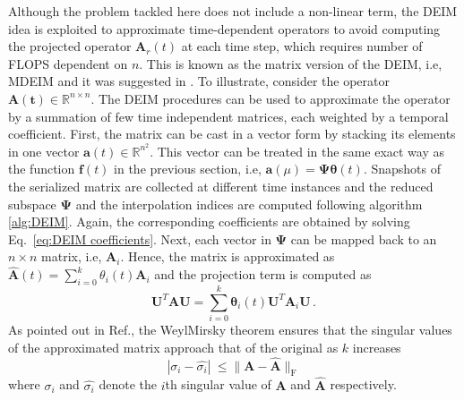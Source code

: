 \documentclass[]{interact}
\theoremstyle{plain}%
\theoremstyle{definition}
\theoremstyle{remark}
\begin{document}
Although the problem tackled here does not include a non-linear term, the DEIM idea is exploited to approximate time-dependent operators to avoid computing the projected operator $\mathbf{A}_r(t)$ at each time step, which requires number of FLOPS dependent on $n$.
This is known as the matrix version of the DEIM, i.e, MDEIM and it was suggested in \cite{carlberg2012efficient, benner2015survey}.
To illustrate, consider the operator $\mathbf{A}(\boldsymbol{t}) \in \mathbb{R}^{n\times n}$.
The DEIM procedures can be used to approximate the operator by a summation of few time independent matrices, each weighted by a temporal coefficient.
First, the matrix can be cast in a vector form by stacking its elements in one vector $\mathbf{a}(t) \in \mathbb{R}^{n^2}$.
This vector can be treated in the same exact way as the function $\mathbf{f}(t)$ in the previous section, i.e, $\mathbf{a}(\mu) = \mathbf{\Psi}\boldsymbol{\theta}(t)$.
Snapshots of the serialized matrix are collected at different time instances and the reduced subspace $\mathbf{\Psi}$ and the interpolation indices are computed following algorithm \ref{alg:DEIM}.
Again, the corresponding coefficients are obtained by solving Eq.~\ref{eq:DEIM coefficients}. 
Next, each vector in $\mathbf{\Psi}$ can be mapped back to an $n \times n$ matrix, i.e, $\textbf{A}_i$.
Hence, the matrix is approximated as $\mathbf{\hat{A}}(t)=\sum_{i=0}^k \theta_i(t) \mathbf{A}_i$ and the projection term is computed as
\begin{equation}
	\mathbf{U}^T\mathbf{A}\mathbf{U} = \sum_{i=0}^k \mathbf{\theta}_i(t)\mathbf{U}^T\mathbf{A}_i\mathbf{U} \, .
	\label{Eq:deim matrix projection}
\end{equation}
As pointed out in Ref.\cite{negri2015efficient}, the Weyl\textendash Mirsky theorem \cite{weyl1912asymptotische} ensures that the singular values of the approximated matrix approach that of the original as $k$ increases 
\begin{equation}
	|\sigma_i - \hat{\sigma_i}  |\ \le \|\mathbf{A} - \hat{\mathbf{A}}\|_\text{F}
\end{equation}
where $\sigma_i$ and $\hat{\sigma_i}$ denote the $i$th singular value of $\mathbf{A}$ and $\hat{\mathbf{A}}$ respectively.
\end{document}
